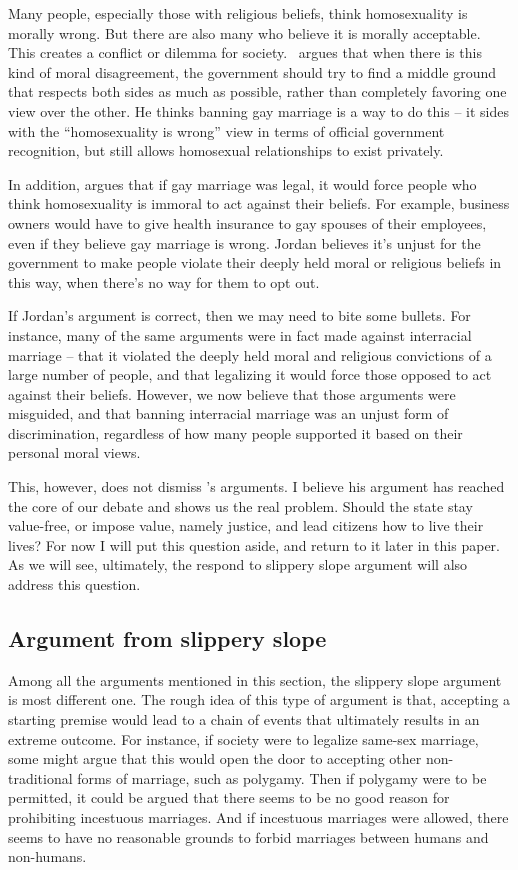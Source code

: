 \documentclass[man,floatsintext]{apa7}
\begin{document}
Many people, especially those with religious beliefs, think homosexuality is morally wrong. But there are also many who believe it is morally acceptable. This creates a conflict or dilemma for society.~\textcite{jordanItWrongDiscriminate1995} argues that when there is this kind of moral disagreement, the government should try to find a middle ground that respects both sides as much as possible, rather than completely favoring one view over the other. He thinks banning gay marriage is a way to do this -- it sides with the ``homosexuality is wrong'' view in terms of official government recognition, but still allows homosexual relationships to exist privately. 

In addition,  argues that if gay marriage was legal, it would force people who think homosexuality is immoral to act against their beliefs. For example, business owners would have to give health insurance to gay spouses of their employees, even if they believe gay marriage is wrong. Jordan believes it's unjust for the government to make people violate their deeply held moral or religious beliefs in this way, when there's no way for them to opt out. 

If Jordan's argument is correct, then we may need to bite some bullets. For instance, many of the same arguments were in fact made against interracial marriage -- that it violated the deeply held moral and religious convictions of a large number of people, and that legalizing it would force those opposed to act against their beliefs. However, we now believe that those arguments were misguided, and that banning interracial marriage was an unjust form of discrimination, regardless of how many people supported it based on their personal moral views. 

This, however, does not dismiss 's arguments. I believe his argument has reached the core of our debate and shows us the real problem. Should the state stay value-free, or impose value, namely justice, and lead citizens how to live their lives? For now I will put this question aside, and return to it later in this paper. As we will see, ultimately, the respond to slippery slope argument will also address this question.


\subsection{Argument from slippery slope}

Among all the arguments mentioned in this section, the slippery slope argument is most different one. The rough idea of this type of argument is that, accepting a starting premise would lead to a chain of events that ultimately results in an extreme outcome. For instance, if society were to legalize same-sex marriage, some might argue that this would open the door to accepting other non-traditional forms of marriage, such as polygamy. Then if polygamy were to be permitted, it could be argued that there seems to be no good reason for prohibiting incestuous marriages. And if incestuous marriages were allowed, there seems to have no reasonable grounds to forbid marriages between humans and non-humans. 
\end{document}
